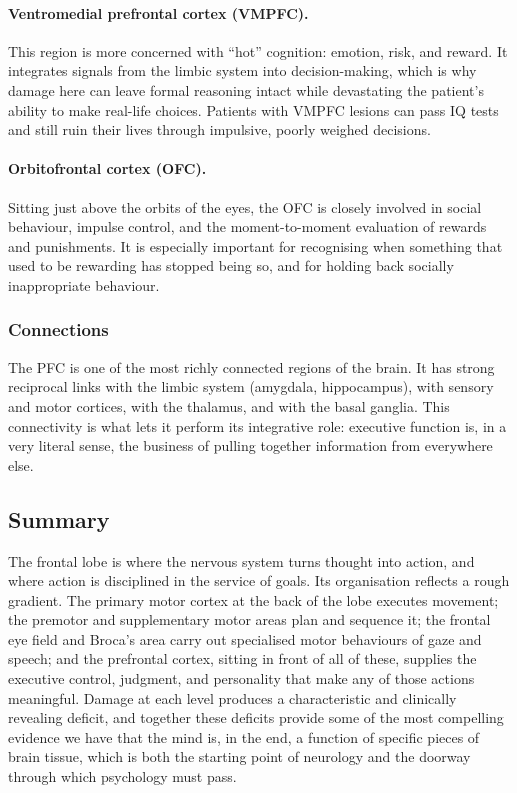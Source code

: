 \documentclass[11pt]{article}
\begin{document}
\paragraph{Ventromedial prefrontal cortex (VMPFC).} This region is more concerned with ``hot'' cognition: emotion, risk, and reward. It integrates signals from the limbic system into decision-making, which is why damage here can leave formal reasoning intact while devastating the patient's ability to make real-life choices. Patients with VMPFC lesions can pass IQ tests and still ruin their lives through impulsive, poorly weighed decisions.

\paragraph{Orbitofrontal cortex (OFC).} Sitting just above the orbits of the eyes, the OFC is closely involved in social behaviour, impulse control, and the moment-to-moment evaluation of rewards and punishments. It is especially important for recognising when something that used to be rewarding has stopped being so, and for holding back socially inappropriate behaviour.

\subsubsection{Connections}

The PFC is one of the most richly connected regions of the brain. It has strong reciprocal links with the limbic system (amygdala, hippocampus), with sensory and motor cortices, with the thalamus, and with the basal ganglia. This connectivity is what lets it perform its integrative role: executive function is, in a very literal sense, the business of pulling together information from everywhere else.

\subsection{Summary}

The frontal lobe is where the nervous system turns thought into action, and where action is disciplined in the service of goals. Its organisation reflects a rough gradient. The primary motor cortex at the back of the lobe executes movement; the premotor and supplementary motor areas plan and sequence it; the frontal eye field and Broca's area carry out specialised motor behaviours of gaze and speech; and the prefrontal cortex, sitting in front of all of these, supplies the executive control, judgment, and personality that make any of those actions meaningful. Damage at each level produces a characteristic and clinically revealing deficit, and together these deficits provide some of the most compelling evidence we have that the mind is, in the end, a function of specific pieces of brain tissue, which is both the starting point of neurology and the doorway through which psychology must pass.
\end{document}
